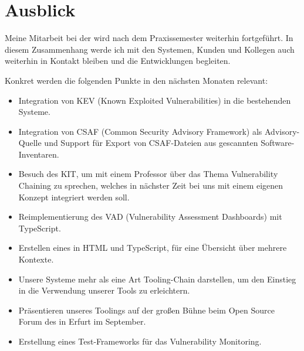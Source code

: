 
\chapter{Ausblick} \label{ch:ausblick}

Meine Mitarbeit bei der {\metaeffekt} wird nach dem Praxissemester weiterhin fortgeführt.
In diesem Zusammenhang werde ich mit den Systemen, Kunden und Kollegen auch weiterhin in Kontakt bleiben und die Entwicklungen begleiten.

Konkret werden die folgenden Punkte in den nächsten Monaten relevant:

\begin{itemize}
    \item Integration von KEV (Known Exploited Vulnerabilities) in die bestehenden Systeme.
    \item Integration von CSAF (Common Security Advisory Framework) als Advisory-Quelle und Support für Export von CSAF-Dateien aus gescannten Software-Inventaren.
    \item Besuch des KIT, um mit einem Professor über das Thema Vulnerability Chaining zu sprechen, welches in nächster Zeit bei uns mit einem eigenen Konzept integriert werden soll.
    \item Reimplementierung des VAD (Vulnerability Assessment Dashboards) mit TypeScript.
    \item Erstellen eines  in HTML und TypeScript, für eine Übersicht über mehrere Kontexte.
    \item Unsere Systeme mehr als eine Art Tooling-Chain darstellen, um den Einstieg in die Verwendung unserer Tools zu erleichtern.
    \item Präsentieren unseres Toolings auf der großen Bühne beim Open Source Forum des {\bitkom} in Erfurt im September.
    \item Erstellung eines Test-Frameworks für das Vulnerability Monitoring.
\end{itemize}
